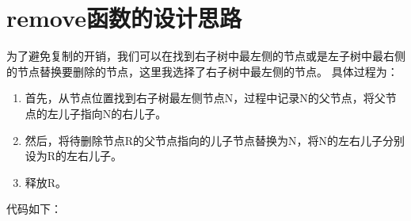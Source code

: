 \documentclass[UTF8]{ctexart}
\begin{document}
\pagestyle{fancy}
\fancyhead{}

\section{remove函数的设计思路}

为了避免复制的开销，我们可以在找到右子树中最左侧的节点或是左子树中最右侧的节点替换要删除的节点，这里我选择了右子树中最左侧的节点。
具体过程为：
\begin{enumerate}
    \item 首先，从节点位置找到右子树最左侧节点N，过程中记录N的父节点，将父节点的左儿子指向N的右儿子。
    \item 然后，将待删除节点R的父节点指向的儿子节点替换为N，将N的左右儿子分别设为R的左右儿子。
    \item 释放R。
\end{enumerate}
\par 代码如下：
\end{document}
